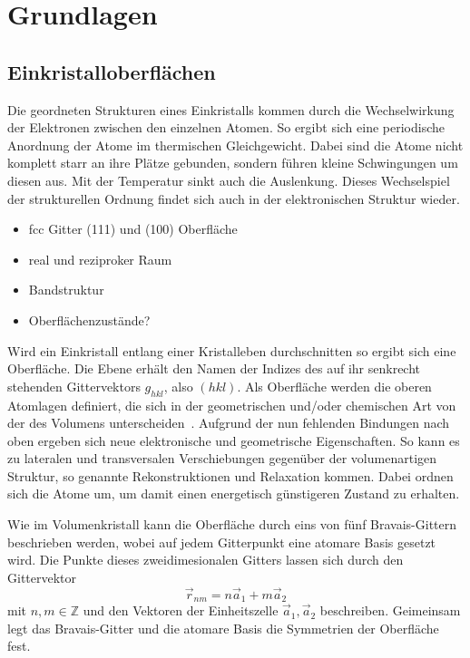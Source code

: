 \chapter{Grundlagen}
    \section{Einkristalloberflächen}
        Die geordneten Strukturen eines Einkristalls kommen durch die Wechselwirkung der Elektronen zwischen den einzelnen Atomen.
        So ergibt sich eine periodische Anordnung der Atome im thermischen Gleichgewicht.
        Dabei sind die Atome nicht komplett starr an ihre Plätze gebunden, sondern führen kleine Schwingungen um diesen aus.
        Mit der Temperatur sinkt auch die Auslenkung.
        Dieses Wechselspiel der strukturellen Ordnung findet sich auch in der elektronischen Struktur wieder.
        \begin{itemize}
            \item fcc Gitter (111) und (100) Oberfläche
            \item real und reziproker Raum
            \item Bandstruktur
            \item Oberflächenzustände?
        \end{itemize}
        
        Wird ein Einkristall entlang einer Kristalleben durchschnitten so ergibt sich eine Oberfläche.
        Die Ebene erhält den Namen der Indizes des auf ihr senkrecht stehenden Gittervektors $g_{hkl}$, also $(hkl)$.
        Als Oberfläche werden die oberen Atomlagen definiert, die sich in der geometrischen und/oder chemischen Art von der des Volumens unterscheiden~\cite{Fauster}.
        Aufgrund der nun fehlenden Bindungen nach oben ergeben sich neue elektronische und geometrische Eigenschaften.
        So kann es zu lateralen und transversalen Verschiebungen gegenüber der volumenartigen Struktur, so genannte Rekonstruktionen und Relaxation kommen.
        Dabei ordnen sich die Atome um, um damit einen energetisch günstigeren Zustand zu erhalten.

        Wie im Volumenkristall kann die Oberfläche durch eins von fünf Bravais-Gittern beschrieben werden, wobei auf jedem Gitterpunkt eine atomare Basis gesetzt wird.
        Die Punkte dieses zweidimesionalen Gitters lassen sich durch den Gittervektor
        \begin{equation}
            \vec{r}_{nm} = n \vec{a}_1 + m \vec{a}_2
            \label{eqn:Gittervek}
        \end{equation}
        mit $n,m \in \mathbb{Z}$ und den Vektoren der Einheitszelle $\vec{a}_1, \vec{a}_2$ beschreiben.
        Geimeinsam legt das Bravais-Gitter und die atomare Basis die Symmetrien der Oberfläche fest.

